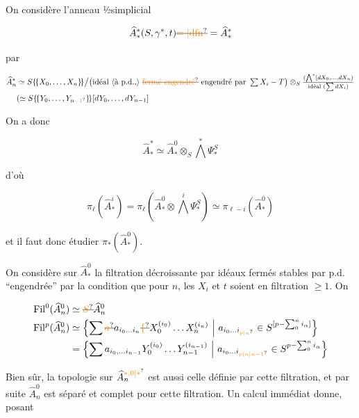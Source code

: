 
On considère l'anneau ½simplicial

\[
 \widehat A_*^*(S,\gamma^*,t)\deleted{\unsure{=|\mathrm{dfn}}}=\widehat A_*^*
\]

par

\[
\begin{aligned}
\widehat A_n^* &\simeq S\{\!\{X_0,\ldots,X_n\}\!\}\big/\bigl(\text{idéal \inserted{à p.d.,} \deleted{\unsure{fermé engendré}} engendré par }\textstyle\sum X_i-T\bigr)
 \otimes_S\frac{(\bigwedge^*[dX_0,\ldots,dX_n)}{\text{idéal }(\sum dX_i)}\\
 &(\simeq S\{\!\{Y_0,\ldots,Y_{n\unsure{-1}}\}\!\}[dY_0,\ldots,dY_{n-1}]
\end{aligned}
\]

On a donc \deleted{$\simeq$}

\[
 \widehat A_*^*\simeq\widehat A_*^0\otimes_S\bigwedge^*\Psi_*^S
\]

d'où

\[
 \pi_\ell(\widehat A_*^i)=\pi_\ell(\widehat A_*^0\otimes\bigwedge^i\Psi_*^S)\simeq\pi_{\ell-i}(\widehat A_*^0)
\]

et il faut donc étudier $\pi_*(\widehat A_*^0)$.

On considère sur $\widehat A_*^0$  la filtration décroissante par idéaux fermés stables par p.d. ``engendrée'' par la condition que  pour  $n$, les $X_i$ et $t$ soient en filtration $\geq 1$. On

\[
\begin{aligned}
\operatorname{Fil}^0(\widehat A_n^0)&\simeq \deleted{\unsure{S}}\widehat A_n^0\\
\operatorname{Fil}^p(\widehat A_n^0)&\simeq\left\{\sum\deleted{\unsure{a}}a_{i_0\ldots i_n}\deleted{\unsure{\{}}X_0^{(i_0)}\ldots X_n^{(i_n)}\ \middle|\ a_{i_0\ldots i_{\unsure{p|n}}}\in S^{[p-\sum_0^n i_\alpha]}\right\}\\
 &=\left\{\sum a_{i_0,\ldots i_{n-1}}Y_0^{(i_0)}\ldots Y_{n-1}^{(i_{n-1})}\ \middle|\ a_{i_0\ldots i_{\unsure{p|n|n-1}}}\in S^{p-\sum_0^n i_\alpha}\right\}
\end{aligned}
\]

Bien sûr, la topologie  sur $\widehat A_n^{\unsure{*,0|*}}$ est aussi celle définie par cette filtration, et par suite $\widehat A_n^0$ est séparé et complet pour cette filtration. Un calcul immédiat donne, posant

